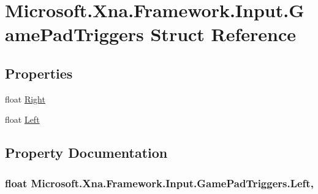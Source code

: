 \hypertarget{struct_microsoft_1_1_xna_1_1_framework_1_1_input_1_1_game_pad_triggers}{}\section{Microsoft.\+Xna.\+Framework.\+Input.\+Game\+Pad\+Triggers Struct Reference}
\label{struct_microsoft_1_1_xna_1_1_framework_1_1_input_1_1_game_pad_triggers}
\subsection*{Properties}
\begin{DoxyCompactItemize}
\item 
float \hyperlink{struct_microsoft_1_1_xna_1_1_framework_1_1_input_1_1_game_pad_triggers_ae95cfa58f6b8a000015da928da9ab2c0}{Right}
\item 
float \hyperlink{struct_microsoft_1_1_xna_1_1_framework_1_1_input_1_1_game_pad_triggers_a9a6c478ef65689262aa7aadf78b32cc9}{Left}
\end{DoxyCompactItemize}


\subsection{Property Documentation}
\hypertarget{struct_microsoft_1_1_xna_1_1_framework_1_1_input_1_1_game_pad_triggers_a9a6c478ef65689262aa7aadf78b32cc9}{}
\subsubsection[{Left}]{\setlength{\rightskip}{0pt plus 5cm}float Microsoft.\+Xna.\+Framework.\+Input.\+Game\+Pad\+Triggers.\+Left\hspace{0.3cm}{\ttfamily [get]}, {\ttfamily [set]}}\label{struct_microsoft_1_1_xna_1_1_framework_1_1_input_1_1_game_pad_triggers_a9a6c478ef65689262aa7aadf78b32cc9}
\hypertarget{struct_microsoft_1_1_xna_1_1_framework_1_1_input_1_1_game_pad_triggers_ae95cfa58f6b8a000015da928da9ab2c0}{}
